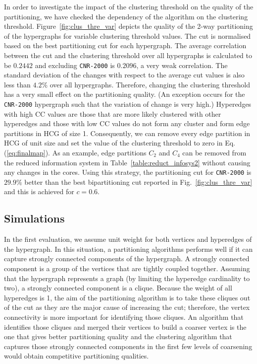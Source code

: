 \documentclass[twocolumn]{svjour3}          \smartqed
\begin{document}
In order to investigate the impact of the clustering threshold on the quality of the partitioning, we have checked the dependency of the algorithm on the clustering threshold. Figure~\ref{fig:clus_thre_var} depicts the quality of the {2-way} partitioning of the hypergraphs for variable clustering threshold values. The cut is normalised based on the best partitioning cut for each hypergraph. The average correlation between the cut and the clustering threshold over all hypergraphs is calculated to be $0.2442$ and excluding \texttt{CNR-2000} is $0.2096$, a very weak correlation. The standard deviation of the changes with respect to the average cut values is also less than $4.2\%$ over all hypergraphs. Therefore, changing the clustering threshold has a very small effect on the partitioning quality. (An exception occurs for the \texttt{CNR-2000} hypergraph such that the variation of change is very high.) Hyperedges with high CC values are those that are more likely clustered with other hyperedges and those with low CC values do not form any cluster and form edge partitions in HCG of size 1. Consequently, we can remove every edge partition in HCG of unit size and set the value of the clustering threshold to zero in Eq.(\ref{eq:finalmap}). As an example, edge partitions $C_2$ and $C_4$ can be removed from the reduced information system in Table~\ref{table:reduct_infosys2} without causing any changes in the cores. Using this strategy, the partitioning cut for \texttt{CNR-2000} is $29.9\%$ better than the best bipartitioning cut reported in Fig.~\ref{fig:clus_thre_var} and this is achieved for $c=0.6$.


\subsection{Simulations}\label{sec:simulations}

In the first evaluation, we assume unit weight for both vertices and hyperedges of the hypergraph. In this situation, a partitioning algorithms performs well if it can capture strongly connected components of the hypergraph.  A strongly connected component is a group of the vertices that are tightly coupled together. Assuming that the hypergraph represents a graph (by limiting the hyperedge cardinality to two), a strongly connected component is a clique. Because the weight of all hyperedges is 1, the aim of the partitioning algorithm is to take these cliques out of the cut as they are the major cause of increasing the cut; therefore, the vertex connectivity is more important for identifying those cliques. An algorithm that identifies those cliques and merged their vertices to build a coarser vertex is the one that gives better partitioning quality and the clustering algorithm that captures those strongly connected components in the first few levels of coarsening would obtain competitive partitioning qualities.
\end{document}
